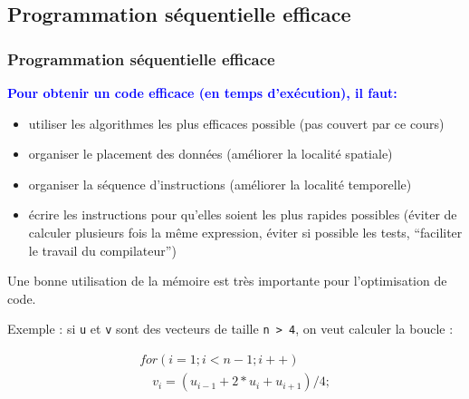 \documentclass{beamer}
\begin{document}
\begin{frame}
\section{Programmation s\'equentielle efficace}
\frametitle{Programmation s\'equentielle efficace}

\bf
\textcolor{blue}{Pour obtenir un code efficace (en temps d'ex\'ecution), il faut:}

\begin{itemize}
	\item utiliser les algorithmes les plus efficaces possible (pas couvert par ce cours)
	
	\item organiser le placement des donn\'ees (am\'eliorer la localit\'e spatiale)
	
	\item organiser la s\'equence d'instructions (am\'eliorer la localit\'e temporelle)

	\item \'ecrire les instructions pour qu'elles soient les plus rapides possibles (éviter de calculer plusieurs fois la même expression, \'eviter si possible les tests, ``faciliter le travail du compilateur'')
\end{itemize}
\end{frame}

\begin{frame}[fragile]
	Une bonne utilisation de la mémoire est très importante pour l'optimisation de code.
	\bigskip

	Exemple : si \verb|u| et \verb|v| sont des vecteurs de taille \verb|n > 4|, on veut calculer la boucle :

\begin{equation}
\begin{array}{l}
for (i=1; i<n-1; i++) \\
\quad  v_i = (u_{i-1} + 2*u_{i} + u_{i+1})/4;
\end{array}
\end{equation}

\end{frame}
\end{document}
